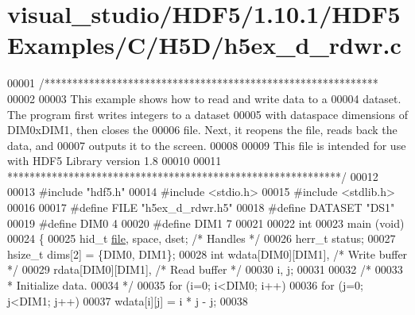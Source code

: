\hypertarget{visual__studio_2_h_d_f5_21_810_81_2_h_d_f5_examples_2_c_2_h5_d_2h5ex__d__rdwr_8c_source}{}\section{visual\+\_\+studio/\+H\+D\+F5/1.10.1/\+H\+D\+F5\+Examples/\+C/\+H5\+D/h5ex\+\_\+d\+\_\+rdwr.c}
\label{visual__studio_2_h_d_f5_21_810_81_2_h_d_f5_examples_2_c_2_h5_d_2h5ex__d__rdwr_8c_source}

\begin{DoxyCode}
00001 \textcolor{comment}{/************************************************************}
00002 \textcolor{comment}{}
00003 \textcolor{comment}{  This example shows how to read and write data to a}
00004 \textcolor{comment}{  dataset.  The program first writes integers to a dataset}
00005 \textcolor{comment}{  with dataspace dimensions of DIM0xDIM1, then closes the}
00006 \textcolor{comment}{  file.  Next, it reopens the file, reads back the data, and}
00007 \textcolor{comment}{  outputs it to the screen.}
00008 \textcolor{comment}{}
00009 \textcolor{comment}{  This file is intended for use with HDF5 Library version 1.8}
00010 \textcolor{comment}{}
00011 \textcolor{comment}{ ************************************************************/}
00012 
00013 \textcolor{preprocessor}{#include "hdf5.h"}
00014 \textcolor{preprocessor}{#include <stdio.h>}
00015 \textcolor{preprocessor}{#include <stdlib.h>}
00016 
00017 \textcolor{preprocessor}{#define FILE            "h5ex\_d\_rdwr.h5"}
00018 \textcolor{preprocessor}{#define DATASET         "DS1"}
00019 \textcolor{preprocessor}{#define DIM0            4}
00020 \textcolor{preprocessor}{#define DIM1            7}
00021 
00022 \textcolor{keywordtype}{int}
00023 main (\textcolor{keywordtype}{void})
00024 \{
00025     hid\_t       \hyperlink{structfile}{file}, space, dset;          \textcolor{comment}{/* Handles */}
00026     herr\_t      status;
00027     hsize\_t     dims[2] = \{DIM0, DIM1\};
00028     \textcolor{keywordtype}{int}         wdata[DIM0][DIM1],          \textcolor{comment}{/* Write buffer */}
00029                 rdata[DIM0][DIM1],          \textcolor{comment}{/* Read buffer */}
00030                 i, j;
00031 
00032     \textcolor{comment}{/*}
00033 \textcolor{comment}{     * Initialize data.}
00034 \textcolor{comment}{     */}
00035     \textcolor{keywordflow}{for} (i=0; i<DIM0; i++)
00036         \textcolor{keywordflow}{for} (j=0; j<DIM1; j++)
00037             wdata[i][j] = i * j - j;
00038 

\end{DoxyCode}

